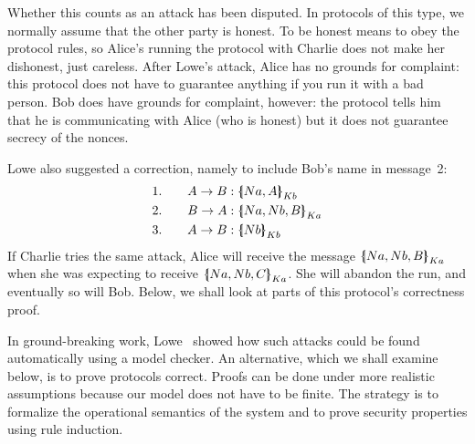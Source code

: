 Whether this counts as an attack has been disputed.  In protocols of this
type, we normally assume that the other party is honest.  To be honest
means to obey the protocol rules, so Alice's running the protocol with
Charlie does not make her dishonest, just careless.  After Lowe's
attack, Alice has no grounds for complaint: this protocol does not have to
guarantee anything if you run it with a bad person.  Bob does have
grounds for complaint, however: the protocol tells him that he is
communicating with Alice (who is honest) but it does not guarantee
secrecy of the nonces.

Lowe also suggested a correction, namely to include Bob's name in
message~2:
\begin{alignat*}{2}
  &1.&\quad  A\to B  &: \mathopen{\{\kern-.30em|} Na,A\mathclose{|\kern-.32em\}}\sb{Kb} \\
  &2.&\quad  B\to A  &: \mathopen{\{\kern-.30em|} Na,Nb,B\mathclose{|\kern-.32em\}}\sb{Ka} \\
  &3.&\quad  A\to B  &: \mathopen{\{\kern-.30em|} Nb\mathclose{|\kern-.32em\}}\sb{Kb}
\end{alignat*}
If Charlie tries the same attack, Alice will receive the message
$\mathopen{\{\kern-.30em|} Na,Nb,B\mathclose{|\kern-.32em\}}\sb{Ka}$ when she was expecting to receive
$\mathopen{\{\kern-.30em|} Na,Nb,C\mathclose{|\kern-.32em\}}\sb{Ka}$.  She will abandon the run, and eventually so
will Bob.  Below, we shall look at parts of this protocol's correctness
proof. 

In ground-breaking work, Lowe~\cite{lowe-fdr}
showed how such attacks
could be found automatically using a model checker.  An alternative,
which we shall examine below, is to prove protocols correct.  Proofs
can be done under more realistic assumptions because our model does
not have to be finite.  The strategy is to formalize the operational
semantics of the system and to prove security properties using rule
induction.%







